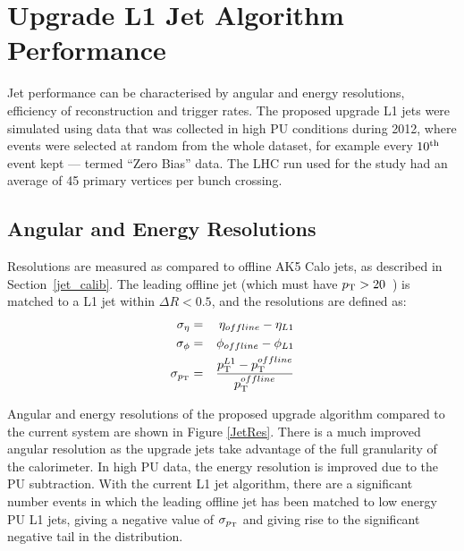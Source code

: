 \section{Upgrade L1 Jet Algorithm Performance}
Jet performance can be characterised by angular and energy resolutions, efficiency of reconstruction and trigger rates. The proposed upgrade \ac{L1} jets were simulated using data that was collected in high \ac{PU} conditions during 2012, where events were selected at random from the whole dataset, for example every $10^{\rm th}$ event kept --- termed ``Zero Bias'' data. 
The \ac{LHC} run used for the study had an average of 45 primary vertices per bunch crossing.  

\subsection{Angular and Energy Resolutions}

Resolutions are measured as compared to offline AK5 Calo jets, as described in Section~\ref{jet_calib}. 
The leading offline jet (which must have $p_{\text{T}} > 20$~\GeV) is matched to a  \ac{L1} jet within $\Delta R < 0.5$, and the resolutions are defined as:
\begin{eqnarray}
\sigma_{\eta} &=& \eta_{offline} - \eta_{L1} \\
\sigma_{\phi} &=& \phi_{offline} - \phi_{L1}\\
\sigma_{p_{\text{T}}} &=& \frac{ p_{\text{T}}^{L1} - p_{\text{T}}^{offline} } { p_{\text{T}}^{offline} } 
\end{eqnarray}  

Angular and energy resolutions of the proposed upgrade algorithm compared to the current system are shown in Figure \ref{JetRes}.
There is a much improved angular resolution as the upgrade jets take advantage of the full granularity of the calorimeter. In high PU data, the energy resolution is improved due to the PU subtraction. 
With the current \ac{L1} jet algorithm, there are a significant number events in which the leading offline jet has been matched to low energy \ac{PU} \ac{L1} jets, giving a negative value of $\sigma_{p_{\text{T}}}$ and giving rise to the significant negative tail in the distribution.

